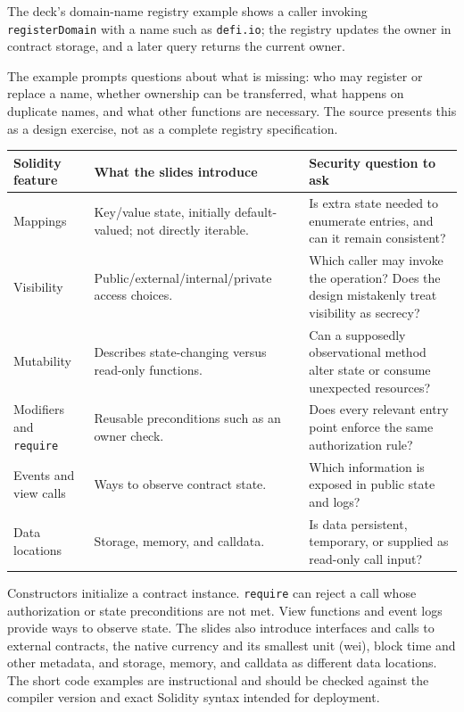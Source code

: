 \documentclass[11pt,a4paper]{article}
\numberwithin{figure}{section}
\begin{document}
The deck's domain-name registry example shows a caller invoking \texttt{registerDomain} with a name such as \texttt{defi.io}; the registry updates the owner in contract storage, and a later query returns the current owner.

The example prompts questions about what is missing: who may register or replace a name, whether ownership can be transferred, what happens on duplicate names, and what other functions are necessary. The source presents this as a design exercise, not as a complete registry specification.

\begin{center}\small
\begin{tabularx}{\linewidth}{@{}p{35mm}YY@{}}\toprule
Solidity feature & What the slides introduce & Security question to ask\\\midrule
Mappings & Key/value state, initially default-valued; not directly iterable. & Is extra state needed to enumerate entries, and can it remain consistent?\\
Visibility & Public/external/internal/private access choices. & Which caller may invoke the operation? Does the design mistakenly treat visibility as secrecy?\\
Mutability & Describes state-changing versus read-only functions. & Can a supposedly observational method alter state or consume unexpected resources?\\
Modifiers and \texttt{require} & Reusable preconditions such as an owner check. & Does every relevant entry point enforce the same authorization rule?\\
Events and view calls & Ways to observe contract state. & Which information is exposed in public state and logs?\\
Data locations & Storage, memory, and calldata. & Is data persistent, temporary, or supplied as read-only call input?\\\bottomrule
\end{tabularx}\end{center}

Constructors initialize a contract instance. \texttt{require} can reject a call whose authorization or state preconditions are not met. View functions and event logs provide ways to observe state. The slides also introduce interfaces and calls to external contracts, the native currency and its smallest unit (wei), block time and other metadata, and storage, memory, and calldata as different data locations. The short code examples are instructional and should be checked against the compiler version and exact Solidity syntax intended for deployment.
\end{document}
